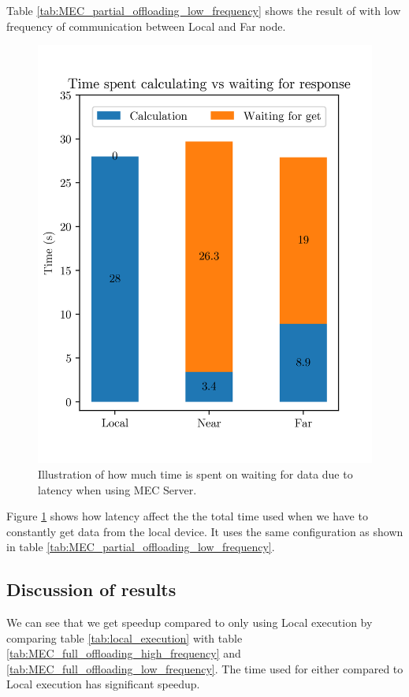 Table \ref{tab:MEC_partial_offloading_low_frequency} shows the result of with low frequency of communication between Local and Far node. 


\begin{figure}[t]
    \centering
    \includegraphics[scale=1]{chapters/evaluation/figures/MEC_Partial_bar.png}
    \caption{Illustration of how much time is spent on waiting for data due to latency when using MEC Server.}
    \label{fig:MEC_partial_bar}
\end{figure}

Figure \ref{fig:MEC_partial_bar} shows how latency affect the the total time used when we have to constantly get data from the local device. It uses the same configuration as shown in table \ref{tab:MEC_partial_offloading_low_frequency}.


\subsection{Discussion of results} \label{subsection:MEC_comparison}%
We can see that we get speedup compared to only using Local execution by comparing table \ref{tab:local_execution} with table \ref{tab:MEC_full_offloading_high_frequency} and \ref{tab:MEC_full_offloading_low_frequency}. The time used for either compared to Local execution has significant speedup.

